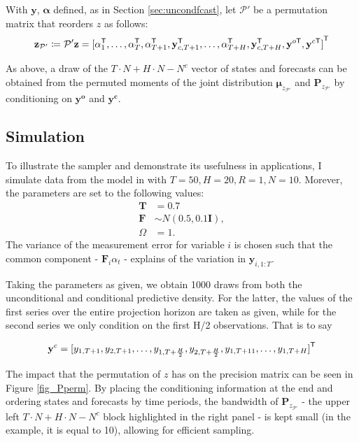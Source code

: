 \documentclass[notitlepage,a4paper,12pt]{article}
\newcommand{\transpose}[1]{{#1}^{\sf{T}}}
\begin{document}
With $\mathbf{y}$, $\boldsymbol{\alpha}$ defined, as in Section \ref{sec:uncondfcast}, let $\mathcal{P}'$ be a permutation matrix that reorders $z$ as follows:
$$
\mathbf{z}_{\mathcal{P}'} \coloneqq \mathcal{P}' \mathbf{z} =
 \transpose{[
     \alpha^{\sf{T}}_1, 
     \dots, 
     \alpha^{\sf{T}}_T, 
     \alpha^{\sf{T}}_{T+1}, 
     \mathbf{y}^{\sf{T}}_{c,T+1}, 
     \dots, 
     \alpha^{\sf{T}}_{T+H}, 
     \mathbf{y}^{\sf{T}}_{c,T+H},
     \mathbf{y}^{o\sf{T}},
     \mathbf{y}^{c\sf{T}}]}
$$

As above, a draw of the $T\!\cdot\!N + H\!\cdot\!N - N^c$ vector of states and forecasts can be obtained from the permuted moments of the joint distribution $\boldsymbol{\mu}_{z_{\mathcal{P}'}} $ and $\mathbf{P}_{z_{\mathcal{P}'}} $ by conditioning on $\mathbf{y^{o}}$ and $\mathbf{y^c}$. 

\subsection{Simulation}

To illustrate the sampler and demonstrate its usefulness in applications, I simulate data from the model in with $T=50, H=20, R = 1, N=10$. Morever, the parameters are set to the following values: 
\begin{align*}
\mathbf{T} &= 0.7 \\
\mathbf{F} &\sim N(0.5, 0.1 \mathbf{I}), \\
\Omega &= 1.
\end{align*}
The variance of the measurement error for variable $i$ is chosen such that the common component - $\mathbf{F}_i \alpha_t$ - explains  of the variation in $\mathbf{y}_{i,1:T}$. 

Taking the parameters as given, we obtain 1000 draws from both the unconditional and conditional predictive density. For the latter, the values of the first series over the entire projection horizon are taken as given, while for the second series we only condition on the first H/2 observations. That is to say 

$$\mathbf{y}^c = \transpose{[y_{1,T+1}, y_{2,T+1}, \dots, y_{1,T+\frac{H}{2}}, y_{2,T+\frac{H}{2}}, y_{1,T+11}, \dots, y_{1,T+H}]}
$$

The impact that the permutation of $z$ has on the precision matrix can be seen in Figure \ref{fig_Pperm}. By placing the conditioning information at the end and ordering states and forecasts by time periods, the bandwidth of $\mathbf{P}_{z_{\mathcal{P}'}}$ - the upper left $T\!\cdot\!N + H\!\cdot\!N - N^c$ block highlighted in the right panel - is kept small (in the example, it is equal to 10), allowing for efficient sampling. 
\end{document}
